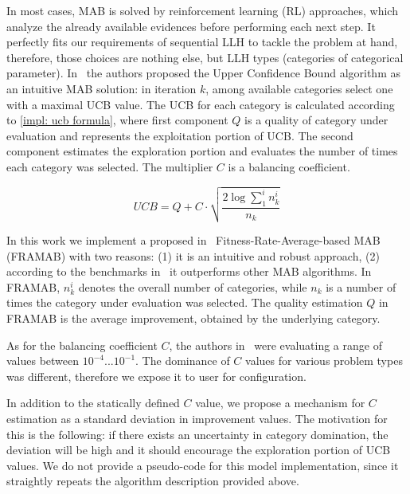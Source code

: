 In most cases, MAB is solved by reinforcement learning (RL) approaches, which analyze the already available evidences before performing each next step. It perfectly fits our requirements of sequential LLH to tackle the problem at hand, therefore, those choices are nothing else, but LLH types (categories of categorical parameter). In~\cite{auer2002finite} the authors proposed the Upper Confidence Bound algorithm as an intuitive MAB solution: in iteration $k$, among available categories select one with a maximal UCB value. The UCB for each category is calculated according to \cref{impl: ucb formula}, where first component $Q$ is a quality of category under evaluation and represents the exploitation portion of UCB. The second component estimates the exploration portion and evaluates the number of times each category was selected. The multiplier $C$ is a balancing coefficient.

\begin{equation}
UCB = Q + C \cdot \sqrt{\frac{2 \log \sum_{1}^{i} n_k^i}{n_k}}
\label{impl: ucb formula}
\end{equation}

In this work we implement a proposed in~\cite{li2013adaptive} Fitness-Rate-Average-based MAB (FRAMAB) with two reasons: (1) it is an intuitive and robust approach, (2) according to the benchmarks in~\cite{ferreira2017multi} it outperforms other MAB algorithms. In FRAMAB, $n_k^i$ denotes the overall number of categories, while $n_k$ is a number of times the category under evaluation was selected. The quality estimation $Q$ in FRAMAB is the average improvement, obtained by the underlying category.

As for the balancing coefficient $C$, the authors in~\cite{ferreira2017multi} were evaluating a range of values between $10^{-4}...10^{-1}$. The dominance of $C$ values for various problem types was different, therefore we expose it to user for configuration. 

In addition to the statically defined $C$ value, we propose a mechanism for $C$ estimation as a standard deviation in improvement values. The motivation for this is the following: if there exists an uncertainty in category domination, the deviation will be high and it should encourage the exploration portion of UCB values. We do not provide a pseudo-code for this model implementation, since it straightly repeats the algorithm description provided above.


